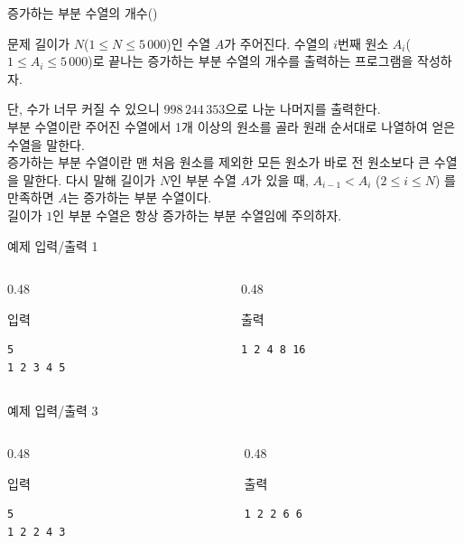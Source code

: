 
\begin{frame}[label=p1]{증가하는 부분 수열의 개수(\prob)}
\small

\begin{block}{문제}
길이가 $N$($1 \le N \le 5\,000$)인 수열 $A$가 주어진다. 수열의 $i$번째 원소 $A_i$($1 \le A_i \le 5\,000$)로 끝나는 증가하는 부분 수열의 개수를 출력하는 프로그램을 작성하자.

단, 수가 너무 커질 수 있으니 $998\,244\,353$으로 나눈 나머지를 출력한다. \\

부분 수열이란 주어진 수열에서 1개 이상의 원소를 골라 원래 순서대로 나열하여 얻은 수열을 말한다. \\

증가하는 부분 수열이란 맨 처음 원소를 제외한 모든 원소가 바로 전 원소보다 큰 수열을 말한다. 다시 말해 길이가 $N$인 부분 수열 $A$가 있을 때, $A_{i-1} < A_i$ ($2 \le i \le N$) 를 만족하면 $A$는 증가하는 부분 수열이다. \\

길이가 $1$인 부분 수열은 항상 증가하는 부분 수열임에 주의하자.
\end{block}
\end{frame}

\begin{frame}[fragile]{예제 입력/출력 1}
\begin{columns}[T]
\begin{column}{0.48\textwidth}
\begin{block}{입력}
\begin{verbatim}
5
1 2 3 4 5
\end{verbatim}
\end{block}
\end{column}
\begin{column}{0.48\textwidth}
\begin{block}{출력}
\begin{verbatim}
1 2 4 8 16
\end{verbatim}
\end{block}
\end{column}
\end{columns}
\end{frame}

\begin{frame}[fragile]{예제 입력/출력 3}
\begin{columns}[T]
\begin{column}{0.48\textwidth}
\begin{block}{입력}
\begin{verbatim}
5
1 2 2 4 3
\end{verbatim}
\end{block}
\end{column}
\begin{column}{0.48\textwidth}
\begin{block}{출력}
\begin{verbatim}
1 2 2 6 6
\end{verbatim}
\end{block}
\end{column}
\end{columns}
\end{frame}

